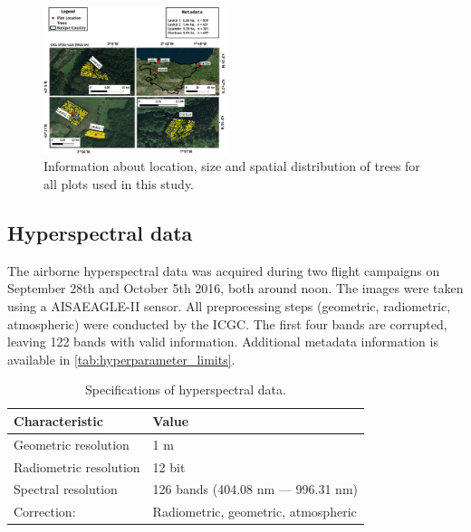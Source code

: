 \documentclass[letterpaper, peerreview, draftcls]{IEEEtran}
\begin{document}
\begin{figure} [t!]
	\begin{center}
		\centering
		\includegraphics[width=0.48\textwidth] {study-area-hyperspectral.pdf}
		\caption{Information about location, size and spatial distribution of trees for all plots used in this study.}\label{fig:study_area}
	\end{center}
\end{figure}



\subsection{Hyperspectral data}

\noindent The airborne hyperspectral data was acquired during two flight campaigns on September 28th and October 5th 2016, both around noon.
The images were taken using a AISAEAGLE-II sensor.
All preprocessing steps (geometric, radiometric, atmospheric) were conducted by the \ac{ICGC}.
The first four bands are corrupted, leaving 122 bands with valid information.
Additional metadata information is available in \autoref{tab:hyperparameter_limits}.


\begin{table}[t]
\centering
\caption[t]{Specifications of hyperspectral data.}
\begingroup
\begin{tabular}{ll}
	\\
	Characteristic         & Value                               \\
	\toprule
	Geometric resolution   & 1 m                                 \\
	Radiometric resolution & 12 bit                              \\
	Spectral resolution    & 126 bands (404.08 nm --- 996.31 nm) \\
	Correction:            & Radiometric, geometric, atmospheric
\end{tabular}
\endgroup\label{tab:hyperparameter_limits}
\end{table}
\end{document}
